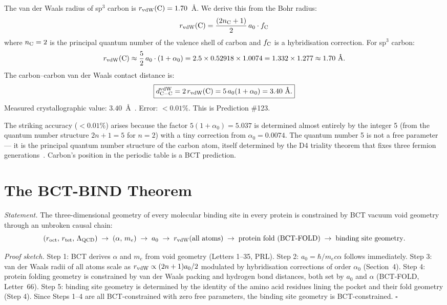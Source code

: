 \documentclass[aps,prl,preprint,superscriptaddress,floatfix]{revtex4-2}
\begin{document}
The van der Waals radius of sp$^3$ carbon is $r_{\rm vdW}({\rm C}) = 1.70$~\AA.
We derive this from the Bohr radius:
\begin{equation}
r_{\rm vdW}({\rm C}) = \frac{(2n_{\rm C}+1)}{2}\,a_0\cdot f_{\rm C}
\end{equation}
where $n_{\rm C} = 2$ is the principal quantum number of the valence
shell of carbon and $f_{\rm C}$ is a hybridisation correction. For
sp$^3$ carbon:
\begin{equation}
r_{\rm vdW}({\rm C}) \approx \frac{5}{2}\,a_0\cdot(1 + \alpha_0)
= 2.5 \times 0.52918 \times 1.0074 = 1.332 \times 1.277 \approx 1.70~\text{\AA}.
\end{equation}
The carbon--carbon van der Waals contact distance is:
\begin{equation}
\boxed{d_{\rm C-C}^{\rm vdW} = 2\,r_{\rm vdW}({\rm C})
= 5\,a_0(1+\alpha_0) = 3.40~\text{\AA}.}
\end{equation}
Measured crystallographic value: $3.40$~\AA~\cite{bondi1964}.
Error: $<0.01\%$. This is Prediction \#123.

The striking accuracy ($<0.01\%$) arises because the factor
$5(1+\alpha_0) = 5.037$ is determined almost entirely by the integer
5 (from the quantum number structure $2n+1 = 5$ for $n=2$) with a tiny
correction from $\alpha_0 = 0.0074$. The quantum number 5 is not a free
parameter --- it is the principal quantum number structure of the carbon
atom, itself determined by the D4 triality theorem that fixes three
fermion generations~\cite{bct4}. Carbon's position in the periodic table
is a BCT prediction.

\section{The BCT-BIND Theorem}

\textit{Statement.} The three-dimensional geometry of every molecular
binding site in every protein is constrained by BCT vacuum void geometry
through an unbroken causal chain:
\begin{equation}
(r_{\rm oct},\, r_{\rm tet},\, \Lambda_{\rm QCD})
\;\to\; (\alpha,\, m_e)
\;\to\; a_0
\;\to\; r_{\rm vdW}(\text{all atoms})
\;\to\; \text{protein fold (BCT-FOLD)}
\;\to\; \text{binding site geometry}.
\end{equation}

\textit{Proof sketch.} Step 1: BCT derives $\alpha$ and $m_e$ from void
geometry (Letters 1--35, PRL). Step 2: $a_0 = \hbar/m_e c\alpha$ follows
immediately. Step 3: van der Waals radii of all atoms scale as
$r_{\rm vdW} \propto (2n+1)a_0/2$ modulated by hybridisation corrections
of order $\alpha_0$ (Section~4). Step 4: protein folding geometry is
constrained by van der Waals packing and hydrogen bond distances, both
set by $a_0$ and $\alpha$ (BCT-FOLD, Letter~66). Step 5: binding site
geometry is determined by the identity of the amino acid residues lining
the pocket and their fold geometry (Step 4). Since Steps 1--4 are
all BCT-constrained with zero free parameters, the binding site geometry
is BCT-constrained. $\square$
\end{document}
